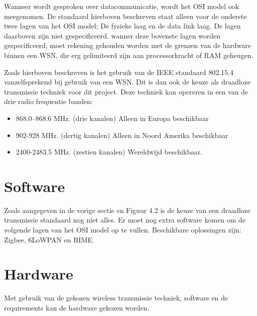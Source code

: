 \documentclass{../local}
\begin{document}
Wanneer wordt gesproken over datacommunicatie, wordt het OSI model ook meegenomen. De standaard hierboven beschreven staat alleen voor de onderste twee lagen van het OSI model; De fysieke laag en de data link laag. De lagen daarboven zijn niet gespecificeerd. wanner deze bovenste lagen worden gespecificeerd, moet rekening gehouden worden met de grenzen van de hardware binnen een WSN, die erg gelimiteerd zijn aan processorkracht of RAM geheugen.
\\\cite{gutierrez2004low}

Zoals hierboven beschreven is het gebruik van de IEEE standaard 802.15.4 vanzelfsprekend bij gebruik van een WSN. Dit is dan ook de keuze als draadloze transmissie techniek voor dit project. Deze techniek kan opereren in een van de drie radio frequentie banden:
\begin{itemize}
\item 868.0–868.6 MHz. (drie kanalen) Alleen in Europa beschikbaar
\item 902-928 MHz. (dertig kanalen) Alleen in Noord Amerika beschikbaar
\item 2400-2483.5 MHz. (zestien kanalen) Wereldwijd beschikbaar.
\end{itemize}

\section{Software}
Zoals aangegeven in de vorige sectie en Figuur 4.2 is de keuze van een draadloze transmissie standaard nog niet alles. Er moet nog extra software komen om de volgende lagen van het OSI model op te vullen. Beschikbare oplossingen zijn: Zigbee, 6LoWPAN en RIME.

\section{Hardware}
Met gebruik van de gekozen wireless transmissie techniek, software en de requirements kan de hardware gekozen worden. 
%
\end{document}
